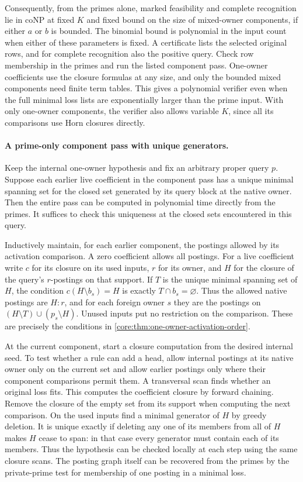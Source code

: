 Consequently, from the primes alone, marked
feasibility and complete recognition lie in coNP
at fixed $K$ and fixed bound on the size of mixed-owner
components, if either $a$ or $b$ is bounded. The
binomial bound is polynomial in the input count
when either of these parameters is fixed.
A certificate lists the selected original rows,
and for complete recognition also the positive
query. Check row membership in the primes and run
the listed component pass. One-owner coefficients
use the closure formulas at any size, and only
the bounded mixed components need finite term
tables. This gives a polynomial verifier even when
the full minimal loss lists are exponentially larger
than the prime input.
With only one-owner components, the verifier also
allows variable $K$, since all its comparisons use
Horn closures directly.

\paragraph{A prime-only component pass with unique generators.}
Keep the internal one-owner hypothesis and fix an arbitrary
proper query $p$. Suppose each earlier live coefficient in
the component pass has a unique minimal spanning set for
the closed set generated by its query block at the native
owner. Then the entire pass can be computed in polynomial
time directly from the primes. It suffices to check this
uniqueness at the closed sets encountered in this query.

Inductively maintain, for each earlier component, the
postings allowed by its activation comparison. A zero
coefficient allows all postings. For a live coefficient
write $c$ for its closure on its used inputs, $r$ for its
owner, and $H$ for the closure of the query's $r$-postings
on that support. If $T$
is the unique minimal spanning set of $H$, the condition
$c(H\setminus b_s)=H$ is exactly $T\cap b_s=\varnothing$.
Thus the allowed native postings are $H:r$, and for each
foreign owner $s$ they are the postings on
$(H\setminus T)\cup(p_s\setminus H)$. Unused inputs put
no restriction on the comparison. These are precisely
the conditions in \cref{core:thm:one-owner-activation-order}.

At the current component, start a closure computation
from the desired internal seed. To test whether a rule
can add a head, allow internal postings at its native
owner only on the current set and allow earlier postings
only where their component comparisons permit them.
A transversal scan finds whether an original loss fits.
This computes the coefficient closure by forward chaining.
Remove the closure of the empty set from its support
when computing the next comparison. On the used inputs
find a minimal generator of $H$ by greedy deletion.
It is unique exactly if deleting any one of its members
from all of $H$ makes $H$ cease to span: in that case
every generator must contain each of its members. Thus
the hypothesis can be checked locally at each step
using the same closure scans. The posting graph itself
can be recovered from the primes by the private-prime
test for membership of one posting in a minimal loss.

